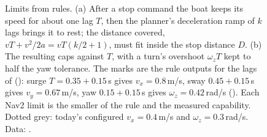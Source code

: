 \begin{figure}[tbp]
\caption{Limits from rules. (a) After a stop command the boat keeps its speed for about
one lag $T$, then the planner's deceleration ramp of $k$ lags brings it to rest; the
distance covered, $vT + v^2/2a = vT(k/2+1)$, must fit inside the stop distance $D$.
(b) The resulting caps against $T$, with a turn's overshoot $\omega_z T$ kept to half the
yaw tolerance. The marks are the rule outputs for the lags of 
(): surge $T = 0.35 + 0.15$\,s gives $v_x = 0.8$\,m/s, sway
$0.45 + 0.15$\,s gives $v_y = 0.67$\,m/s, yaw $0.15 + 0.15$\,s gives $\omega_z = 0.42$\,rad/s
(). Each Nav2 limit is the smaller of the rule
and the measured capability. Dotted grey: today's configured $v_x = 0.4$\,m/s and
$\omega_z = 0.3$\,rad/s. Data: .}
\label{fig:limits}
\end{figure}
